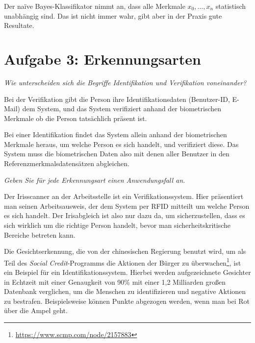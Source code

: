 \documentclass[
  ngerman,
  DIV=14
]{scrartcl}
\begin{document}
Der naïve Bayes-Klassifikator nimmt an, dass alle Merkmale $x_0, \dots, x_n$ statistisch unabhängig sind. Das ist nicht immer wahr, gibt aber in der Praxis gute Resultate.

\section*{Aufgabe 3: Erkennungsarten}

\emph{Wie unterscheiden sich die Begriffe \emph{Identifikation} und \emph{Verifikation} voneinander?}

Bei der Verifikation gibt die Person ihre Identifikationsdaten (Benutzer-ID, E-Mail) dem System, und das System verifiziert anhand der biometrischen Merkmale ob die Person tatsächlich präsent ist. 

Bei einer Identifikation findet das System allein anhand der biometrischen Merkmale heraus, um welche Person es sich handelt, und verifiziert diese. Das System muss die biometrischen Daten also mit denen aller Benutzer in den Referenzmerkmalsdatensätzen abgleichen.

\bigskip\noindent
\emph{Geben Sie für jede Erkennungsart einen Anwendungsfall an.}

Der Irisscanner an der Arbeitsstelle ist ein Verifikationssystem. Hier präsentiert man seinen Arbeitsausweis, der dem System per RFID mitteilt um welche Person es sich handelt. Der Irisabgleich ist also nur dazu da, um sicherzustellen, dass es sich wirklich um die richtige Person handelt, bevor man sicherheitskritische Bereiche betreten kann.

Die Gesichtserkennung, die von der chinesischen Regierung benutzt wird, um als Teil des \emph{Social Credit}-Programms die Aktionen der Bürger zu überwachen\footnote{\url{https://www.scmp.com/node/2157883}}, ist ein Beispiel für ein Identifikationssystem. Hierbei werden aufgezeichnete Gesichter in Echtzeit mit einer Genaugkeit von 90\% mit einer 1,2 Milliarden großen Datenbank verglichen, um die Menschen zu identifizieren und negative Aktionen zu bestrafen. Beispielsweise können Punkte abgezogen werden, wenn man bei Rot über die Ampel geht. 
\end{document}

